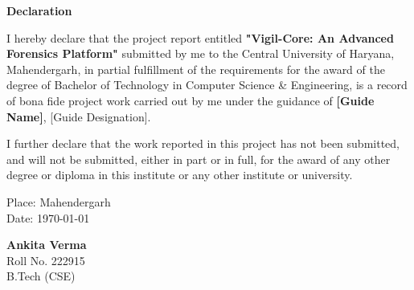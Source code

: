 \begin{center}
\Large{\textbf{Declaration}}
\end{center}
\vspace{1cm}

I hereby declare that the project report entitled \textbf{"Vigil-Core: An Advanced Forensics Platform"} submitted by me to the Central University of Haryana, Mahendergarh, in partial fulfillment of the requirements for the award of the degree of Bachelor of Technology in Computer Science \& Engineering, is a record of bona fide project work carried out by me under the guidance of \textbf{[Guide Name]}, [Guide Designation].

I further declare that the work reported in this project has not been submitted, and will not be submitted, either in part or in full, for the award of any other degree or diploma in this institute or any other institute or university.

\vspace{3cm}

\begin{flushleft}
Place: Mahendergarh\\
Date: \today
\end{flushleft}

\vspace{-2cm}

\begin{flushright}
\textbf{Ankita Verma}\\
Roll No. 222915\\
B.Tech (CSE)
\end{flushright}
